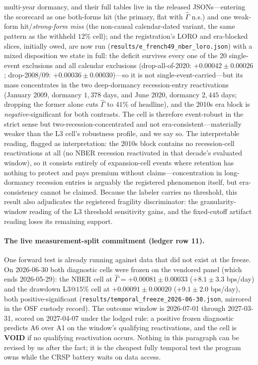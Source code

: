 \documentclass{article}
\begin{document}
multi-year dormancy, and their full tables live in the released
JSONs---entering the scorecard as one both-forms hit (the primary,
flat with $\hat\Gamma$ n.s.) and one weak-form hit/\emph{strong-form
miss} (the non-causal calendar-dated variant, the same pattern as
the withheld $12\%$ cell); and the registration's LORO and era-blocked slices,
initially owed, are now run
(\texttt{results/e\_french49\_nber\_loro.json}) with a mixed
disposition we state in full: the deficit survives every one of the 20
single-event exclusions and all calendar exclusions
(drop-all-of-2020: $+0.00042 \pm 0.00026$; drop-2008/09:
$+0.00036 \pm 0.00030$)---so it is not single-event-carried---but its
mass concentrates in the two deep-dormancy recession-entry
reactivations (January 2009, dormancy $1{,}378$ days, and June 2020,
dormancy $2{,}445$ days; dropping the former alone cuts
$\hat\Gamma$ to $41\%$ of headline), and the 2010s era block is
\emph{negative}-significant for both contrasts. The cell is therefore
event-robust in the strict sense but two-recession-concentrated and
not era-consistent---materially weaker than the L3 cell's robustness
profile, and we say so. The interpretable reading, flagged as
interpretation: the 2010s block contains no recession-cell
reactivations at all (no NBER recession reactivated in that decade's
evaluated window), so it consists entirely of expansion-cell events
where retention has nothing to protect and pays premium without
claims---concentration in long-dormancy recession entries is arguably
the registered phenomenon itself, but era-consistency cannot be
claimed. Because the labeler carries no threshold,
this result also adjudicates the registered fragility discriminator:
the granularity-window reading of the L3 threshold sensitivity gains,
and the fixed-cutoff artifact reading loses its remaining support.

\paragraph{The live measurement-split commitment (ledger row 11).}
One forward test is already running against data that did not exist
at the freeze. On 2026-06-30 both diagnostic cells were frozen on
the vendored panel (which ends 2026-05-29): the NBER cell at
$\hat\Gamma = +0.00081 \pm 0.00033$ ($+8.1 \pm 3.3$ bps/day) and the
drawdown L3@$15\%$ cell at $+0.00091 \pm 0.00020$
($+9.1 \pm 2.0$ bps/day), both positive-significant
(\texttt{results/temporal\_freeze\_2026-06-30.json}, mirrored in the
OSF custody record). The outcome window is 2026-07-01 through
2027-03-31, scored on 2027-04-07 under the lodged rule: a positive
frozen diagnostic predicts A6 over A1 on the window's qualifying
reactivations, and the cell is \textbf{VOID} if no qualifying
reactivation occurs. Nothing in this paragraph can be revised by us
after the fact; it is the cheapest fully temporal test the program
owns while the CRSP battery waits on data access.
\end{document}
